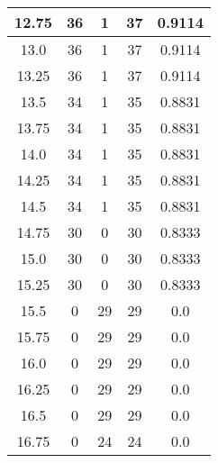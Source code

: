 \documentclass[letterpaper, 12pt]{article}
\begin{document}
\begin{longtable}{|c|c|c|c|c|}
\hline
12.75 & 36 & 1 & 37 & 0.9114 \\
\hline
13.0 & 36 & 1 & 37 & 0.9114 \\
\hline
13.25 & 36 & 1 & 37 & 0.9114 \\
\hline
13.5 & 34 & 1 & 35 & 0.8831 \\
\hline
13.75 & 34 & 1 & 35 & 0.8831 \\
\hline
14.0 & 34 & 1 & 35 & 0.8831 \\
\hline
14.25 & 34 & 1 & 35 & 0.8831 \\
\hline
14.5 & 34 & 1 & 35 & 0.8831 \\
\hline
14.75 & 30 & 0 & 30 & 0.8333 \\
\hline
15.0 & 30 & 0 & 30 & 0.8333 \\
\hline
15.25 & 30 & 0 & 30 & 0.8333 \\
\hline
15.5 & 0 & 29 & 29 & 0.0 \\
\hline
15.75 & 0 & 29 & 29 & 0.0 \\
\hline
16.0 & 0 & 29 & 29 & 0.0 \\
\hline
16.25 & 0 & 29 & 29 & 0.0 \\
\hline
16.5 & 0 & 29 & 29 & 0.0 \\
\hline
16.75 & 0 & 24 & 24 & 0.0 \\
\hline
\end{longtable}
\end{document}
